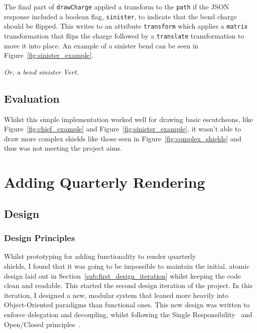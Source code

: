\documentclass[nobib, a4paper, twoside, justified]{tufte-book}
\makeatletter
\newcommand{\charge}{\gls{charge}\@\xspace}
\makeatother
\begin{document}
The final part of \texttt{drawCharge} applied a transform to the \texttt{path} if the JSON response
included a boolean flag, \texttt{sinister}, to indicate that the bend \charge should be flipped.
This writes to an attribute \texttt{transform} which applies a \texttt{matrix} transformation that
flips the \charge followed by a \texttt{translate} transformation to move it into place. An
example of a sinister bend can be seen in Figure~\ref{fig:sinister_example}.

\begin{marginfigure}
  \centering
  \def\svgwidth{0.8\linewidth}
  
  \caption{\textit{Or, a bend sinister Vert.}}\label{fig:sinister_example}
\end{marginfigure}

\subsection{Evaluation}%
\label{sub:first_design_evaluation}

Whilst this simple implementation worked well for drawing basic \glspl{escutcheon}, like
Figure~\ref{fig:chief_example} and Figure~\ref{fig:sinister_example}, it wasn't able to draw more
complex shields like those seen in Figure~\ref{fig:complex_shields} and thus was not meeting the
project aims.

\section{Adding Quarterly Rendering}%
\label{sec:adding_quarterly_rendering}

\subsection{Design}%
\label{sub:second_design_iteration}

\subsubsection{Design Principles}%
\label{ssub:design_principles}

Whilst prototyping for adding functionality to render quarterly \\ shields, I found that it was
going to be impossible to maintain the initial, atomic design laid out in
Section~\ref{sub:first_design_iteration} whilst keeping the code clean and readable. This started
the second design iteration of the project. In this iteration, I designed a new, modular system
that leaned more heavily into Object-Oriented paradigms than functional ones. This new design was
written to enforce delegation and decoupling, whilst following the Single
Responsibility~\autocite{martin2000design} and Open/Closed principles~\autocite{martin2000design}.
\end{document}
